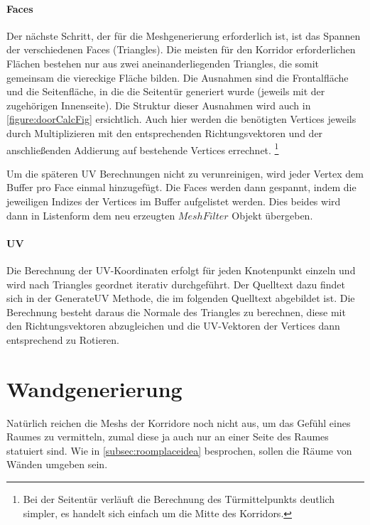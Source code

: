 \paragraph*{Faces}
Der nächste Schritt, der für die Meshgenerierung erforderlich ist, ist das Spannen der verschiedenen Faces (Triangles). Die meisten für den Korridor erforderlichen Flächen bestehen nur aus zwei aneinanderliegenden Triangles, die somit gemeinsam die viereckige Fläche bilden. Die Ausnahmen sind die Frontalfläche und die Seitenfläche, in die die Seitentür generiert wurde (jeweils mit der zugehörigen Innenseite). Die Struktur dieser Ausnahmen wird auch in \autoref{figure:doorCalcFig} ersichtlich.
Auch hier werden die benötigten Vertices jeweils durch Multiplizieren mit den entsprechenden Richtungsvektoren und der anschließenden Addierung auf bestehende Vertices errechnet. \footnote{Bei der Seitentür verläuft die Berechnung des Türmittelpunkts deutlich simpler, es handelt sich einfach um die Mitte des Korridors.}

Um die späteren UV Berechnungen nicht zu verunreinigen, wird jeder Vertex dem Buffer pro Face einmal hinzugefügt. Die Faces werden dann gespannt, indem die jeweiligen Indizes der Vertices im Buffer aufgelistet werden. Dies beides wird dann in Listenform dem neu erzeugten $MeshFilter$ Objekt übergeben.

\paragraph*{UV}
Die Berechnung der UV-Koordinaten erfolgt für jeden Knotenpunkt einzeln und wird nach Triangles geordnet iterativ durchgeführt. Der Quelltext dazu findet sich in der GenerateUV Methode, die im folgenden Quelltext abgebildet ist.
Die Berechnung besteht daraus die Normale des Triangles zu berechnen, diese mit den Richtungsvektoren abzugleichen und die UV-Vektoren der Vertices dann entsprechend zu Rotieren.


\section{Wandgenerierung}
\label{sec:genwalls}
Natürlich reichen die Meshs der Korridore noch nicht aus, um das Gefühl eines Raumes zu vermitteln, zumal diese ja auch nur an einer Seite des Raumes statuiert sind.
Wie in \autoref{subsec:roomplaceidea} besprochen, sollen die Räume von Wänden umgeben sein.

